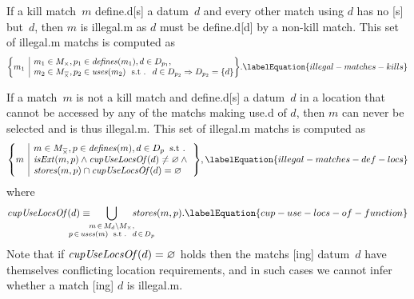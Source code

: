 If a \gls{kill match}~$m$ \gls{define.d}[s] a \gls{datum}~$d$ and every other
\gls{match} using $d$ has no [s] but~$d$, then $m$
is \gls{illegal.m} as $d$ must be \gls{define.d}[d] by a non-\gls{kill match}.
%
This set of \gls{illegal.m} \glspl{match} is computed as
%
\begin{equation}
  \mSetBuilder*{m_1}%
               {%
                 \begin{array}{@{}l@{}}
                   m_1 \in \mKillMatchSet,
                   p_1 \in \mDefines(m_1),
                   d \in \mDataSet[p_1], \\
                   m_2 \in \mKillMatchCompSet,
                   p_2 \in \mUses(m_2) \text{ \st }
                   d \in \mDataSet[p_2] \mImp \mDataSet[p_2] = \mSet{d}
                 \end{array}
               }\!.
  \labelEquation{illegal-matches-kills}
\end{equation}

If a \gls{match}~$m$ is not a \gls{kill match} and \gls{define.d}[s] a
\gls{datum}~$d$ in a \gls{location} that cannot be accessed by any of the
\glspl{match} making \gls{use.d} of $d$, then $m$ can never be selected and is
thus \gls{illegal.m}.
%
This set of \gls{illegal.m} \glspl{match} is computed as
%
\begin{equation}
  \mSetBuilder*{m}%
               {%
                 \begin{array}{@{}l@{}}
                   m \in \mKillMatchCompSet,
                   p \in \mDefines(m),
                   d \in \mDataSet[p] \hspace{-1pt} \text{ \st} \\
                   \mIsExt(m, p)
                   \mAnd
                   \mCupUseLocsOf(d) \neq \mEmptySet
                   \mAnd \mbox{} \\
                   \mStores(m, p) \cap \mCupUseLocsOf(d) = \mEmptySet
                 \end{array}
               }\!,
  \labelEquation{illegal-matches-def-locs}
\end{equation}
%
where
%
\begin{equation}
  \mCupUseLocsOf(d)
  \equiv
  \hspace{-2.5em}
  \bigcup_{
    \substack{
      m \, \in \, \mMatchSet[d] \setminus \mKillMatchSet, \\
      p \, \in \, \mUses(m)
      \text{ \st } d \, \in \, \mDataSet[p]
    }
  }
    \hspace{-2.5em}
    \mStores(m, p).
  \labelEquation{cup-use-locs-of-function}
\end{equation}
%
Note that if \mbox{$\operatorname{\textrm{\textit{cupUseLocsOf}}}(d) = \varnothing$} holds then the
\glspl{match} [ing] \gls{datum}~$d$ have themselves conflicting
\gls{location} requirements, and in such cases we cannot infer whether a
\gls{match} [ing] $d$ is \gls{illegal.m}.

